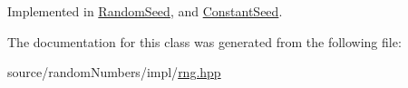 Implemented in \hyperlink{classRandomSeed_fbd454a2e8bc5eda68d9b10e9cb1705c}{RandomSeed}, and \hyperlink{classConstantSeed_38790f9390c6c4d6d27a2f60f1df438f}{ConstantSeed}.

The documentation for this class was generated from the following file:\begin{CompactItemize}
\item 
source/randomNumbers/impl/\hyperlink{rng_8hpp}{rng.hpp}\end{CompactItemize}
